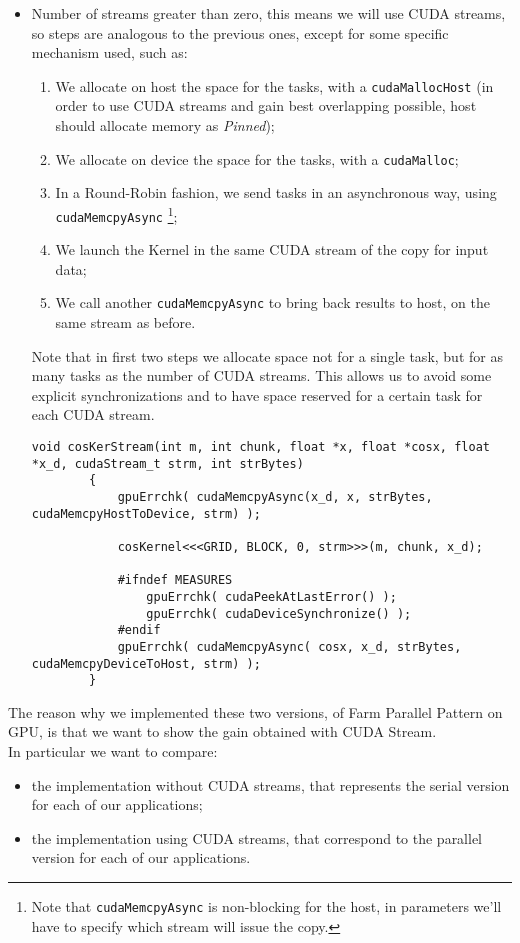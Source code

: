 \begin{itemize}
		\item Number of streams greater than zero, this means we will use CUDA streams, so steps are analogous to the previous ones, except for some specific mechanism used, such as:
		\begin{enumerate}
			\item We allocate on host the space for the tasks, with a \texttt{cudaMallocHost} (in order to use CUDA streams and gain best overlapping possible, host should allocate memory as \textit{Pinned});
			\item We allocate on device the space for the tasks, with a \texttt{cudaMalloc};
			\item In a Round-Robin fashion, we send tasks in an asynchronous way, using \texttt{cudaMemcpyAsync} \footnote{Note that \texttt{cudaMemcpyAsync} is non-blocking for the host, in parameters we'll have to specify which stream will issue the copy.};
			\item We launch the Kernel in the same CUDA stream of the copy for input data;
			\item We call another \texttt{cudaMemcpyAsync} to bring back results to host, on the same stream as before.
		\end{enumerate}
		Note that in first two steps we allocate space not for a single task, but for as many tasks as the number of CUDA streams.
		This allows us to avoid some explicit synchronizations and to have space reserved for a certain task for each CUDA stream.
		\begin{lstlisting}[label=lst:str, caption={Data transfer host/device and kernel call, CUDA Streams version}]
		void cosKerStream(int m, int chunk, float *x, float *cosx, float *x_d, cudaStream_t strm, int strBytes)
		{     
			gpuErrchk( cudaMemcpyAsync(x_d, x, strBytes, cudaMemcpyHostToDevice, strm) ); 
			
			cosKernel<<<GRID, BLOCK, 0, strm>>>(m, chunk, x_d);
			
			#ifndef MEASURES
				gpuErrchk( cudaPeekAtLastError() );
				gpuErrchk( cudaDeviceSynchronize() );
			#endif   
			gpuErrchk( cudaMemcpyAsync( cosx, x_d, strBytes, cudaMemcpyDeviceToHost, strm) );
		}
		\end{lstlisting}
		
	\end{itemize}
	The reason why we implemented these two versions, of Farm Parallel Pattern on GPU, is that we want to show the gain obtained with CUDA Stream.\\
	In particular we want to compare:
	\begin{itemize}
		\item the implementation without CUDA streams, that represents the serial version for each of our applications;
		\item the implementation using CUDA streams, that correspond to the parallel version for each of our applications.
	\end{itemize}
